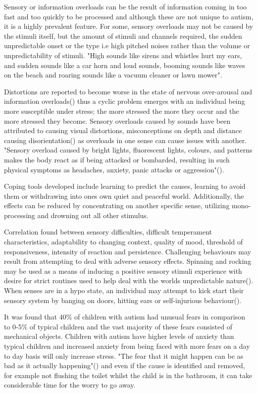 \documentclass[11pt]{report}
\begin{document}
Sensory or information overloads can be the result of information coming in too fast and too quickly to be processed and although these are not unique to autism, it is a highly prevalent feature. For some, sensory overloads may not be caused by the stimuli itself, but the amount of stimuli and channels required, the sudden unpredictable onset or the type i.e high pitched noises rather than the volume or unpredictability of stimuli. "High sounds like sirens and whistles hurt my ears, and sudden sounds like a car horn and loud sounds, booming sounds like waves on the beach and roaring sounds like a vacuum cleaner or lawn mower". 

Distortions are reported to become worse in the state of nervous over-arousal and information overloads(\cite{olgab}) thus a cyclic problem emerges with an individual being more susceptible under stress; the more stressed the more they occur and the more stressed they become. Sensory overloads caused by sounds have been attributed to causing visual distortions, misconceptions on depth and distance causing disorientation(\cite{sensoryexperiences}) as overloads in one sense can cause issues with another. "Sensory overload caused by bright lights, fluorescent lights, colours, and patterns makes the body react as if being attacked or bombarded, resulting in such physical symptoms as headaches, anxiety, panic attacks or aggression"(\cite{bayes}). 

Coping tools developed include learning to predict the causes, learning to avoid them or withdrawing into ones own quiet and peaceful world. Additionally, the effects can be reduced by concentrating on another specific sense, utilizing mono-processing and drowning out all other stimulus. 

Correlation found between sensory difficulties, difficult temperament characteristics, adaptability to changing context, quality of mood, threshold of responsiveness, intensity of reaction and persistence\cite{temperament}. Challenging behaviours may result from attempting to deal with adverse sensory effects. Spinning and rocking may be used as a means of inducing a positive sensory stimuli experience with desire for strict routines used to help deal with the worlds unpredictable nature(\cite{sensory_overview}). When senses are in a hypo state, an individual may attempt to kick start their sensory system by banging on doors, hitting ears or self-injurious behaviour(\cite{sensory_overview}). 

It was found that 40\% of children with autism had unusual fears in comparison to 0-5\% of typical children and the vast majority of these fears consisted of mechanical objects. Children with autism have higher levels of anxiety than typical children\cite{fears} and increased anxiety from being faced with more fears on a day to day basis will only increase stress. "The fear that it might happen can be as bad as it actually happening"(\cite{fears}) and even if the cause is identified and removed, for example not flushing the toilet whilst the child is in the bathroom, it can take considerable time for the worry to go away.
\end{document}

